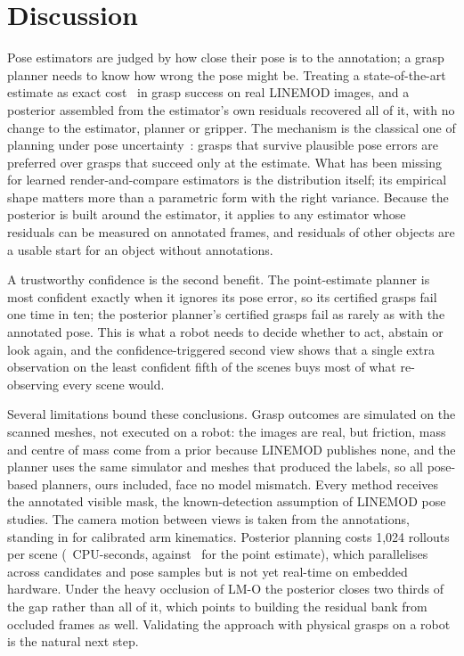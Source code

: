 \documentclass[pdflatex,sn-nature,iicol]{sn-jnl}
\begin{document}
\section{Discussion}\label{sec:discussion}
Pose estimators are judged by how close their pose is to the annotation; a grasp planner needs to know how wrong the pose might be. Treating a state-of-the-art estimate as exact cost \CmpGtPointAbs\ in grasp success on real LINEMOD images, and a posterior assembled from the estimator's own residuals recovered all of it, with no change to the estimator, planner or gripper. The mechanism is the classical one of planning under pose uncertainty~\cite{weisz2012poseerror,hsiao2011robust,mahler2016dexnet1}: grasps that survive plausible pose errors are preferred over grasps that succeed only at the estimate. What has been missing for learned render-and-compare estimators is the distribution itself; its empirical shape matters more than a parametric form with the right variance. Because the posterior is built around the estimator, it applies to any estimator whose residuals can be measured on annotated frames, and residuals of other objects are a usable start for an object without annotations.

A trustworthy confidence is the second benefit. The point-estimate planner is most confident exactly when it ignores its pose error, so its certified grasps fail one time in ten; the posterior planner's certified grasps fail as rarely as with the annotated pose. This is what a robot needs to decide whether to act, abstain or look again, and the confidence-triggered second view shows that a single extra observation on the least confident fifth of the scenes buys most of what re-observing every scene would.

Several limitations bound these conclusions. Grasp outcomes are simulated on the scanned meshes, not executed on a robot: the images are real, but friction, mass and centre of mass come from a prior because LINEMOD publishes none, and the planner uses the same simulator and meshes that produced the labels, so all pose-based planners, ours included, face no model mismatch. Every method receives the annotated visible mask, the known-detection assumption of LINEMOD pose studies. The camera motion between views is taken from the annotations, standing in for calibrated arm kinematics. Posterior planning costs 1,024 rollouts per scene (\CpuPost\ CPU-seconds, against \CpuPoint\ for the point estimate), which parallelises across candidates and pose samples but is not yet real-time on embedded hardware. Under the heavy occlusion of LM-O the posterior closes two thirds of the gap rather than all of it, which points to building the residual bank from occluded frames as well. Validating the approach with physical grasps on a robot is the natural next step.
\end{document}
